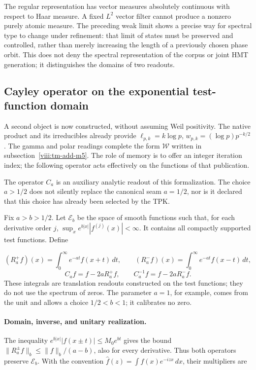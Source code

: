 The regular representation has vector measures absolutely continuous with respect to Haar measure. A fixed \(L^2\) vector filter cannot produce a nonzero purely atomic measure. The preceding weak limit shows a precise way for spectral type to change under refinement: that limit of states must be preserved and controlled, rather than merely increasing the length of a previously chosen phase orbit. This does not deny the spectral representation of the corpus or joint HMT generation; it distinguishes the domains of two readouts.


\subsection{Cayley operator on the exponential test-function domain}
\label{viii:tm-add-m4}
A second object is now constructed, without assuming Weil positivity. The native product and its irreducibles already provide \(\ell_{p,k}=k\log p\), \(w_{p,k}=(\log p)p^{-k/2}\). The gamma and polar readings complete the form \(\mathscr W\) written in subsection~\ref{viii:tm-add-m5}. The role of memory is to offer an integer iteration index; the following operator acts effectively on the functions of that publication.

The operator \(C_a\) is an auxiliary analytic readout of this formalization. The choice \(a>1/2\) does not silently replace the canonical seam \(a=1/2\), nor is it declared that this choice has already been selected by the TPK.

Fix \(a>b>1/2\). Let \(\mathscr E_b\) be the space of smooth functions such that, for each derivative order \(j\), \(\sup_x e^{b|x|}|f^{(j)}(x)|<\infty\). It contains all compactly supported test functions. Define

\[
(R_a^+f)(x)=\int_0^\infty e^{-at}f(x+t)\,dt,
\qquad
(R_a^-f)(x)=\int_0^\infty e^{-at}f(x-t)\,dt,
\]
\[
\boxed{C_af=f-2aR_a^+f,\qquad C_a^{-1}f=f-2aR_a^-f.}
\]
These integrals are translation readouts constructed on the test functions; they do not use the spectrum of zeros. The parameter \(a=1\), for example, comes from the unit and allows a choice \(1/2<b<1\); it calibrates no zero.

\paragraph{Domain, inverse, and unitary realization.} The inequality \(e^{b|x|}|f(x\pm t)|\le M_0e^{bt}\) gives the bound \(\|R_a^\pm f\|_b\le\|f\|_b/(a-b)\), also for every derivative. Thus both operators preserve \(\mathscr E_b\). With the convention \(\widehat f(z)=\int f(x)e^{-izx}\,dx\), their multipliers are

